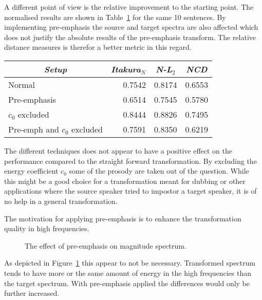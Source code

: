 A different point of view is the relative improvement to the starting point. The normalised results are shown in Table~\ref{tab:normalised_freq_results} for the same 10 sentences. By implementing pre-emphasis the source and target spectra are also affected which does not justify the absolute results of the pre-emphasis transform. The relative distance measures is therefor a better metric in this regard.
\begin{table}[htbp]
	\begin{center}
		\label{tab:normalised_freq_results}
		\begin{tabular}{lrrr}
			\toprule
			\multicolumn{1}{c}{\emph{Setup}} & \multicolumn{1}{c}{\emph{Itakura$_N$}} & \multicolumn{1}{c}{\emph{N-L$_2$}} & \multicolumn{1}{c}{\emph{NCD}}\\
			\midrule
			Normal & 0.7542 & 0.8174 & 0.6553 \\
			Pre-emphasis &  0.6514 & 0.7545 & 0.5780 \\
			$c_0$ excluded & 0.8444 & 0.8826 & 0.7495 \\
			Pre-emph and $c_0$ excluded & 0.7591 & 0.8350 & 0.6219 \\
			\bottomrule			
		\end{tabular}		
	\end{center}	
\end{table}
The different techniques does not appear to have a positive effect on the performance compared to the straight forward transformation. By excluding the energy coefficient $c_0$ some of the prosody are taken out of the question. While this might be a good choice for a transformation meant for dubbing or other applications where the source speaker tried to impostor a target speaker, it is of no help in a general transformation.

The motivation for applying pre-emphasis is to enhance the transformation quality in high frequencies.
\begin{figure}[htbp]
	\begin{center}
	\caption{The effect of pre-emphasis on magnitude spectrum.}
	\label{fig:pre_emphasis_magnitude_spectrum}
	\end{center}
\end{figure}
As depicted in Figure~\ref{fig:pre_emphasis_magnitude_spectrum} this appear to not be necessary. Transformed spectrum tends to have more or the same amount of energy in the high frequencies than the target spectrum. With pre-emphasis applied the differences would only be further increased.

